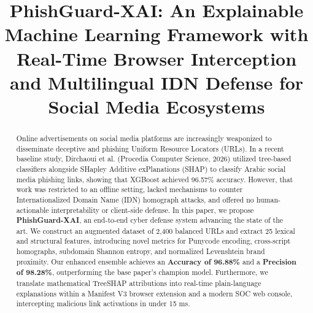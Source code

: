 \documentclass[conference]{IEEEtran}
\begin{document}
\title{PhishGuard-XAI: An Explainable Machine Learning Framework with Real-Time Browser Interception and Multilingual IDN Defense for Social Media Ecosystems}

\author{
\and
{}
\and
{}
\and
{}
}

\maketitle

\begin{abstract}
Online advertisements on social media platforms are increasingly weaponized to disseminate deceptive and phishing Uniform Resource Locators (URLs). In a recent baseline study, Dirchaoui et al. (Procedia Computer Science, 2026) utilized tree-based classifiers alongside SHapley Additive exPlanations (SHAP) to classify Arabic social media phishing links, showing that XGBoost achieved 96.57\% accuracy. However, that work was restricted to an offline setting, lacked mechanisms to counter Internationalized Domain Name (IDN) homograph attacks, and offered no human-actionable interpretability or client-side defense. In this paper, we propose \textbf{PhishGuard-XAI}, an end-to-end cyber defense system advancing the state of the art. We construct an augmented dataset of 2,400 balanced URLs and extract 25 lexical and structural features, introducing novel metrics for Punycode encoding, cross-script homographs, subdomain Shannon entropy, and normalized Levenshtein brand proximity. Our enhanced ensemble achieves an \textbf{Accuracy of 96.88\%} and a \textbf{Precision of 98.28\%}, outperforming the base paper's champion model. Furthermore, we translate mathematical TreeSHAP attributions into real-time plain-language explanations within a Manifest V3 browser extension and a modern SOC web console, intercepting malicious link activations in under 15 ms.
\end{abstract}
\end{document}
